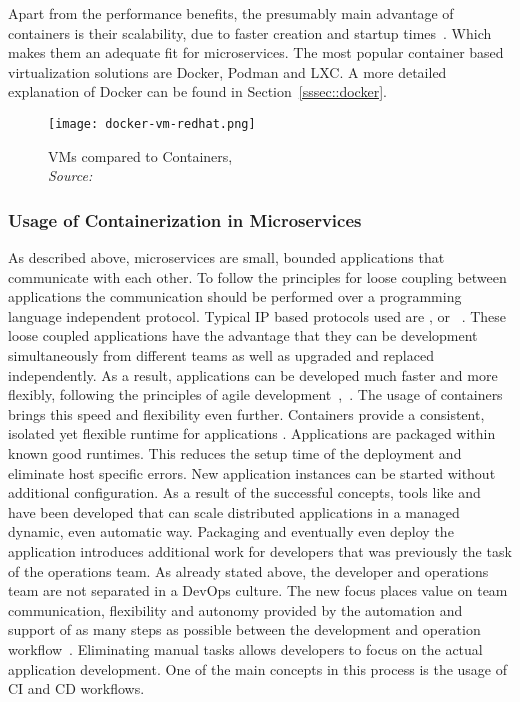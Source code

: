 \documentclass[12pt, a4paper]{article}
\begin{document}
        Apart from the performance benefits, the presumably main advantage of containers is their scalability, due to faster creation and startup times~\cite{cintainer_scale}. Which makes them an adequate fit for microservices. The most popular container based virtualization solutions are Docker, Podman and LXC. A more detailed explanation of Docker can be found in Section~\ref{sssec::docker}.

        \begin{figure}
            \centering
            \texttt{[image: docker-vm-redhat.png]}
            \caption{\ac{VM}s compared to Containers, \\\textit{Source:~\cite{redhat_pic}}}\label{fig::vm_docker}
        \end{figure}

        \subsubsection{Usage of Containerization in Microservices}
        As described above, microservices are small, bounded applications that communicate with each other. To follow the principles for loose coupling between applications the communication should be performed over a programming language independent protocol. Typical \acs{IP} based protocols used are ,  or ~\cite{micro}. These loose coupled applications have the advantage that they can be development simultaneously from different teams as well as upgraded and replaced independently. As a result, applications can be developed much faster and more flexibly, following the principles of agile development~\cite{micro},~\cite{redhat_micro}.\newline
        The usage of containers brings this speed and flexibility even further. Containers provide a consistent, isolated yet flexible runtime for applications \cite{micro_container}. Applications are packaged within known good runtimes. This reduces the setup time of the deployment and eliminate host specific errors. New application instances can be started without additional configuration. As a result of the successful concepts, tools like  and  have been developed that can scale distributed applications in a managed dynamic, even automatic way.\newline
        \noindent Packaging and eventually even deploy the application introduces additional work for developers that was previously the task of the operations team. As already stated above, the developer and operations team are not separated in a DevOps culture. The new focus places value on team communication, flexibility and autonomy provided by the automation and support of as many steps as possible between the development and operation workflow~\cite{effective_devops}. Eliminating manual tasks allows developers to focus on the actual application development. One of the main concepts in this process is the usage of \ac{CI} and \ac{CD} workflows.
\end{document}
